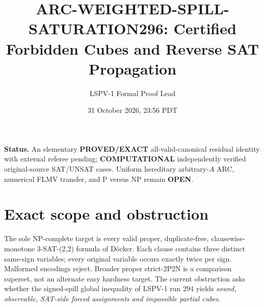 \documentclass[11pt]{article}
\title{ARC-WEIGHTED-SPILL-SATURATION296: Certified Forbidden Cubes and Reverse SAT Propagation}
\author{LSPV-1 Formal Proof Lead}
\date{31 October 2026, 23:56 PDT}
\begin{document}
\maketitle
\noindent\textbf{Status.} An elementary \textbf{PROVED/EXACT} all-valid-canonical residual identity with external referee pending; \textbf{COMPUTATIONAL} independently verified original-source SAT/UNSAT cases. Uniform hereditary arbitrary-$A$ ARC, numerical FLMV transfer, and P versus NP remain \textbf{OPEN}.
\section{Exact scope and obstruction}
The sole NP-complete target is every valid proper, duplicate-free, clausewise-monotone 3-SAT-(2,2) formula of D\"ocker. Each clause contains three distinct same-sign variables; every original variable occurs exactly twice per sign. Malformed encodings reject. Broader proper strict-2P2N is a comparison superset, not an alternate easy hardness target. The current obstruction asks whether the signed-spill global inequality of LSPV-1 run 294 yields \emph{sound, observable, SAT-side forced assignments and impossible partial cubes}.
\end{document}
